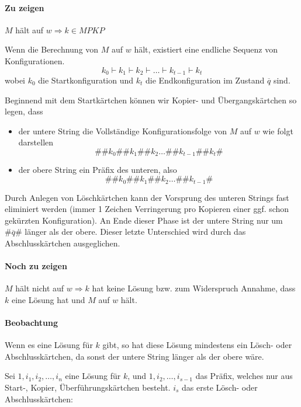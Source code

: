 \paragraph*{Zu zeigen} $M$ hält auf $w \Rightarrow k \in MPKP$

\para{} Wenn die Berechnung von $M$ auf $w$ hält, existiert eine endliche Sequenz von Konfigurationen. $$ k_0 \vdash k_1 \vdash k_2 \vdash \dots \vdash k_{t-1} \vdash k_t $$ wobei $k_0$ die Startkonfiguration und $k_t$ die Endkonfiguration im Zustand $\overline{q}$ sind.

\para{} Beginnend mit dem Startkärtchen können wir Kopier- und Übergangskärtchen so legen, dass
\begin{itemize}
	\item der untere String die Vollständige Konfigurationsfolge von $M$ auf $w$ wie folgt darstellen $$ \#\#k_0\#\#k_1\#\#k_2 \dots \#\#k_{t-1}\#\#k_t\# $$
	\item der obere String ein Präfix des unteren, also $$ \#\#k_0\#\#k_1\#\#k_2 \dots \#\#k_{t-1}\# $$
\end{itemize}

\para{} Durch Anlegen von Löschkärtchen kann der Vorsprung des unteren Strings fast eliminiert werden (immer 1 Zeichen Verringerung pro Kopieren einer ggf. schon gekürzten Konfiguration). An Ende dieser Phase ist der untere String nur um $\#\overline{q}\#$ länger als der obere. Dieser letzte Unterschied wird durch das Abschlusskärtchen ausgeglichen.

\paragraph*{Noch zu zeigen} $M$ hält nicht auf $w \Rightarrow k$ hat keine Lösung bzw. zum Widerspruch Annahme, dass $k$ eine Lösung hat und $M$ auf $w$ hält.

\paragraph*{Beobachtung} Wenn es eine Lösung für $k$ gibt, so hat diese Lösung mindestens ein Lösch- oder Abschlusskärtchen, da sonst der untere String länger als der obere wäre.

\para{} Sei $1,i_1,i_2,\dots,i_n$ eine Lösung für $k$, und $1,i_2,\dots,i_{s-1}$ das Präfix, welches nur aus Start-, Kopier, Überführungskärtchen besteht. $i_s$ das erste Lösch- oder Abschlusskärtchen:

